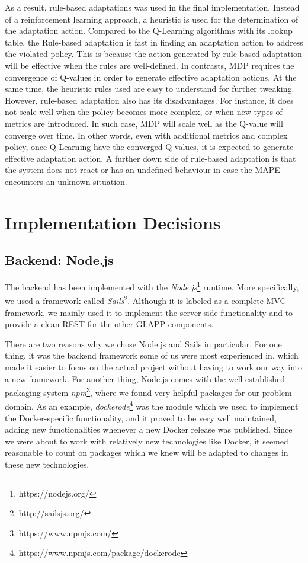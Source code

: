 \documentclass{seal_thesis}
\begin{document}
As a result, rule-based adaptations was used in the final implementation.
Instead of a reinforcement learning approach, a heuristic is used for the determination of the adaptation action.
Compared to the Q-Learning algorithms with its lookup table, the Rule-based adaptation is fast in finding an adaptation action to address the violated policy.
This is because the action generated by rule-based adaptation will be effective when the rules are well-defined.
In contrasts, MDP requires the convergence of Q-values in order to generate effective adaptation actions.
At the same time, the heuristic rules used are easy to understand for further tweaking.
However, rule-based adaptation also has its disadvantages.
For instance, it does not scale well when the policy becomes more complex, or when new types of metrics are introduced.
In such case, MDP will scale well as the Q-value will converge over time. 
In other words, even with additional metrics and complex policy, once Q-Learning have the converged Q-values, it is expected to generate effective adaptation action.
A further down side of rule-based adaptation is that the system does not react or has an undefined behaviour in case the MAPE encounters an unknown situation.

\section{Implementation Decisions}
\subsection{Backend: Node.js}
The backend has been implemented with the \textit{Node.js}\footnote{https://nodejs.org/} runtime.
More specifically, we used a framework called \textit{Sails}\footnote{http://sailsjs.org/}.
Although it is labeled as a complete MVC framework, we mainly used it to implement the server-side functionality and to provide a clean REST for the other GLAPP components.

There are two reasons why we chose Node.js and Sails in particular.
For one thing, it was the backend framework some of us were most experienced in, which made it easier to focus on the actual project without having to work our way into a new framework.
For another thing, Node.js comes with the well-established packaging system \textit{npm}\footnote{https://www.npmjs.com/}, where we found very helpful packages for our problem domain.
As an example, \textit{dockerode}\footnote{https://www.npmjs.com/package/dockerode} was the module which we used to implement the Docker-specific functionality, and it proved to be very well maintained, adding new functionalities whenever a new Docker release was published.
Since we were about to work with relatively new technologies like Docker, it seemed reasonable to count on packages which we knew will be adapted to changes in these new technologies.
\end{document}
